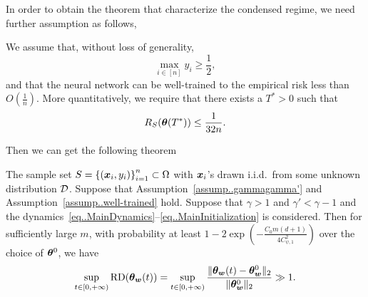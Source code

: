 \documentclass{article}
\begin{document}
In order to obtain the theorem that characterize the condensed regime, we need further assumption as follows,
\begin{assump}\label{assump..well-trained}
    We assume that, without loss of generality,
    \begin{equation}
        \max\limits_{i\in[n]} y_i \geq \frac{1}{2},
    \end{equation}
    and that the neural network can be well-trained to the empirical risk less than $O(\frac{1}{n})$. More quantitatively, we require that there exists a $T^*>0$ such that
    \begin{equation}
        R_S(\bm{\theta}(T^*))\leq\frac{1}{32n}.
    \end{equation}
\end{assump}
Then we can get the following theorem
\begin{thm}\label{thm..CondensedRegime}
    The sample set $S = {\{(\bm{x}_i, y_i)\}}_{i=1}^n\subset\Omega$ with $\bm{x}_i$'s drawn i.i.d.\ from some unknown distribution $\mathcal{D}$. Suppose that Assumption~\ref{assump..gammagamma'} and Assumption~\ref{assump..well-trained} hold. Suppose that $\gamma>1$ and $\gamma'<\gamma-1$ and the dynamics~\eqref{eq..MainDynamics}--\eqref{eq..MainInitialization} is considered. Then for sufficiently large $m$, with probability at least $1-2\exp\left(-\frac{C_0m(d+1)}{4C_{\psi,1}^2}\right)$ over the choice of $\bm{\theta}^0$, we have
    \begin{equation}
        \sup\limits_{t\in[0,+\infty)}\mathrm{RD}(\bm{\theta}_{\bm{w}}(t))=\sup\limits_{t\in[0,+\infty)}\frac{\lVert\bm{\theta}_{\bm{w}}(t)-\bm{\theta}_{\bm{w}}^0\rVert_2}{\lVert\bm{\theta}_{\bm{w}}^0\rVert_2}\gg 1.
    \end{equation}
\end{thm}
\end{document}
